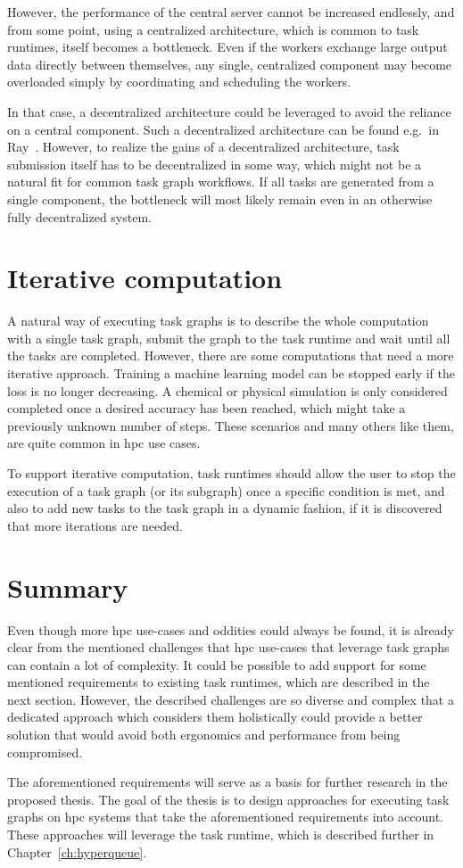 \begin{description}
		However, the performance of the central server cannot be increased endlessly, and from some point,
		using a centralized architecture, which is common to task runtimes, itself becomes a bottleneck.
		Even if the workers exchange large output data directly between themselves, any single, centralized
		component may become overloaded simply by coordinating and scheduling the workers.

		In that case, a decentralized architecture could be leveraged to avoid the reliance on a central
		component. Such a decentralized architecture can be found e.g.\ in Ray~\cite{ray}.
		However, to realize the gains of a decentralized architecture, task submission itself has to be
		decentralized in some way, which might not be a natural fit for common task graph workflows. If all
		tasks are generated from a single component, the bottleneck will most likely remain even in an
		otherwise fully decentralized system.
\end{description}

\section{Iterative computation}
A natural way of executing task graphs is to describe the whole computation with a single task
graph, submit the graph to the task runtime and wait until all the tasks are completed. However,
there are some computations that need a more iterative approach. Training a machine learning model
can be stopped early if the loss is no longer decreasing. A chemical or physical simulation is only
considered completed once a desired accuracy has been reached, which might take a previously
unknown number of steps. These scenarios and many others like them, are quite common in
\gls{hpc} use cases.

To support iterative computation, task runtimes should allow the user to stop the execution of a
task graph (or its subgraph) once a specific condition is met, and also to add new tasks to the
task graph in a dynamic fashion, if it is discovered that more iterations are needed.

\section{Summary}
Even though more \gls{hpc} use-cases and oddities could always be found, it is
already clear from the mentioned challenges that \gls{hpc} use-cases that leverage
task graphs can contain a lot of complexity. It could be possible to add support for some mentioned
requirements to existing task runtimes, which are described in the next section. However, the
described challenges are so diverse and complex that a dedicated approach which considers them
holistically could provide a better solution that would avoid both ergonomics and performance from
being compromised.

The aforementioned requirements will serve as a basis for further research in the proposed thesis.
The goal of the thesis is to design approaches for executing task graphs on
\gls{hpc} systems that take the aforementioned requirements into account. These
approaches will leverage the \hyperqueue{} task runtime, which is described further
in Chapter~\ref{ch:hyperqueue}.
